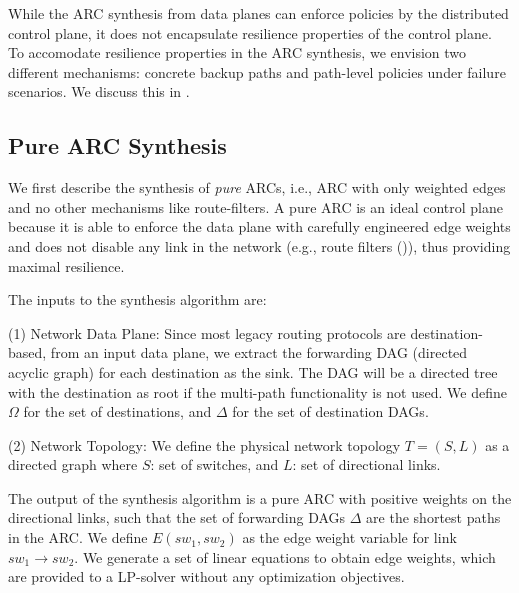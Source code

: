 While the ARC synthesis from data planes can enforce 
policies by the distributed control plane, it does not
encapsulate resilience properties of the control plane. 
To accomodate resilience properties in the ARC synthesis,
we envision two different mechanisms: concrete
backup paths and path-level policies under failure scenarios. 
We discuss this in . 

\subsection{Pure ARC Synthesis}
We first describe the synthesis of {\em pure} ARCs, i.e., 
ARC with only weighted edges and no other mechanisms like route-filters.
A pure ARC is an ideal control plane because it is able to
enforce the data plane with carefully engineered edge weights
and does not disable any link in the network (e.g., route filters
()), thus providing maximal resilience. 

The inputs to the synthesis algorithm are:

(1) Network Data Plane:
Since most legacy routing protocols are destination-based,
from an input data plane, we extract the forwarding
DAG (directed acyclic graph) for each destination
as the sink. The DAG will be a directed tree with the
destination as root if the multi-path
functionality is not used. We define $\Omega$ for the 
set of destinations, and $\Delta$ for  
the set of destination DAGs. 

(2) Network Topology: 
We define the physical network topology $T = (S, L)$
as a directed graph where $S$: set of switches, and 
$L$: set of directional links. 

The output of the synthesis algorithm is a 
pure ARC with positive weights on the directional links,
such that the set of forwarding DAGs $\Delta$ are the 
shortest paths in the ARC. We define $E(sw_1, sw_2)$ as
the edge weight variable for link $sw_1 \rightarrow sw_2$. 
We generate a set of linear equations to obtain edge weights,
which are provided to a LP-solver without any optimization
objectives. 

